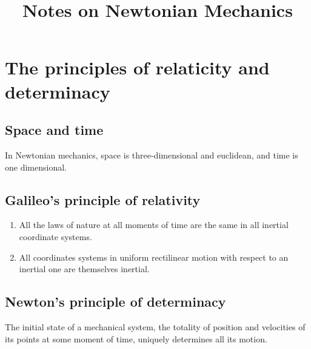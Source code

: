 \documentclass[conference]{IEEEtran}
\theoremstyle{definition}
\theoremstyle{remark}
\begin{document}
    \title{Notes on Newtonian Mechanics}

    \author{}

    \maketitle

    \section{The principles of relaticity and determinacy}

    \subsection{Space and time}
    In Newtonian mechanics, space is three-dimensional and euclidean, and time is one dimensional.

    \subsection{Galileo's principle of relativity}
    \begin{enumerate}
        \item All the laws of nature at all moments of time are the same in all inertial coordinate systems.
        
        \item All coordinates systems in uniform rectilinear motion with respect to an inertial one are themselves inertial.
    \end{enumerate}

    \subsection{Newton's principle of determinacy}
    The initial state of a mechanical system, the totality of position and velocities of its points at some moment of time, uniquely determines all its motion.
\end{document}
